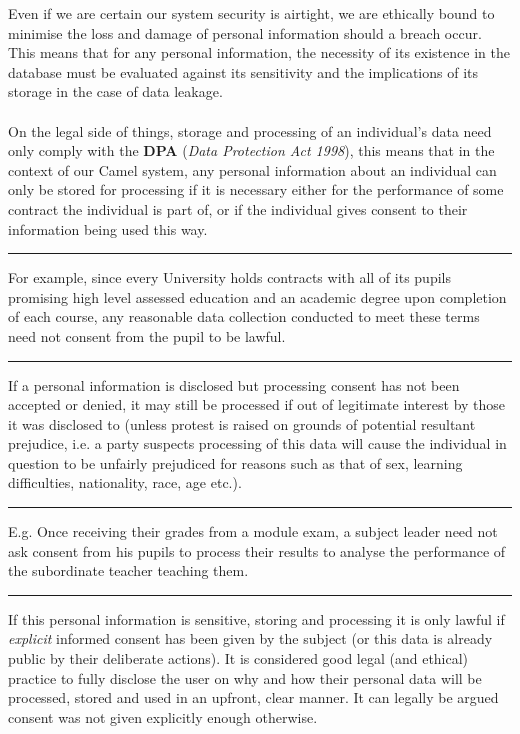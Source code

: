 Even if we are certain our system security is airtight, we are ethically bound to minimise the loss and damage of personal information should a breach occur. This means that for any personal information, the necessity of its existence in the database must be evaluated against its sensitivity and the implications of its storage in the case of data leakage.\\\\
On the legal side of things, storage and processing of an individual’s data need only comply with the \textbf{DPA} (\textit{Data Protection Act 1998}), this means that in the context of our Camel system, any personal information about an individual can only be stored for processing if it is necessary either for the performance of some contract the individual is part of, or if the individual gives consent to their information being used this way.\cite{DPA:tDPP:S1}\cite{DPA:tDPP:S2}
\vspace{0.35cm} \hrule {\raggedleft \scriptsize For example, since every University holds contracts with all of its pupils promising high level assessed education and an academic degree upon completion of each course, any reasonable data collection conducted to meet these terms need not consent from the pupil to be lawful.\par} \vspace{0.35cm} \hrule
If a personal information is disclosed but processing consent has not been accepted or denied, it may still be processed if out of legitimate interest by those it was disclosed to\cite{DPA:tDPP:S2} (unless protest is raised on grounds of potential resultant prejudice, i.e. a party suspects processing of this data will cause the individual in question to be unfairly prejudiced for reasons such as that of sex, learning difficulties, nationality, race, age etc.).
\vspace{0.35cm} \hrule {\raggedleft \scriptsize E.g. Once receiving their grades from a module exam, a subject leader need not ask consent from his pupils to process their results to analyse the performance of the subordinate teacher teaching them.\par} \vspace{0.35cm} \hrule
If this personal information is sensitive, storing and processing it is only lawful if \emph{explicit} informed consent has been given by the subject (or this data is already public by their deliberate actions)\cite{DPA:tDPP:S3}. It is considered good legal (and ethical) practice to fully disclose the user on why and how their personal data will be processed, stored and used in an upfront, clear manner. It can legally be argued consent was not given explicitly enough otherwise.
